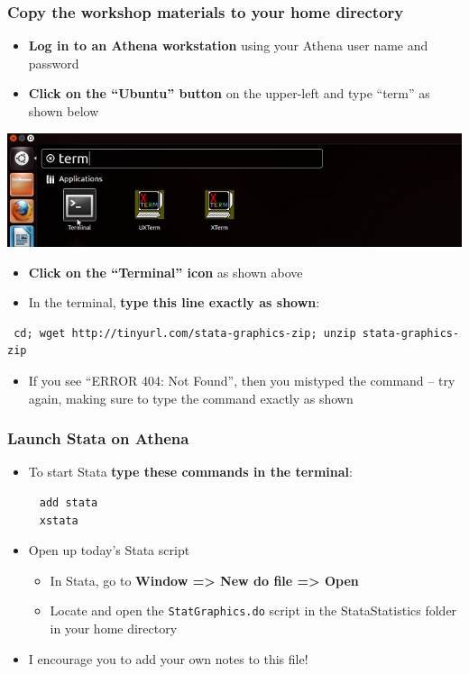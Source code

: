 \documentclass[table]{beamer}
\begin{document}
\begin{frame}[fragile]
\frametitle{Copy the workshop materials to your home directory}
\label{sec-1-2}


\begin{itemize}
\item \textbf{Log in to an Athena workstation} using your Athena user name and password
\item \textbf{Click on the ``Ubuntu'' button} on the upper-left and type ``term'' as shown below
\end{itemize}
\includegraphics[width=.8\textwidth]{./images/OpenTerminal.png}

\begin{itemize}
\item \textbf{Click on the ``Terminal'' icon} as shown above
\item In the terminal, \textbf{type this line exactly as shown}:
\end{itemize}
{\footnotesize
\begin{verbatim}
 cd; wget http://tinyurl.com/stata-graphics-zip; unzip stata-graphics-zip
\end{verbatim}
\normalsize}

\begin{itemize}
\item If you see ``ERROR 404: Not Found'', then you mistyped the command -- try again, making sure to type the command exactly as shown
\end{itemize}
\end{frame}
\begin{frame}[fragile]
\frametitle{Launch Stata on Athena}
\label{sec-1-3}


\begin{itemize}
\item To start Stata \textbf{type these commands in the terminal}:
\end{itemize}
\begin{verbatim}
     add stata
     xstata
\end{verbatim}
\begin{itemize}
\item Open up today's Stata script
\begin{itemize}
\item In Stata, go to \textbf{Window => New do file => Open}
\item Locate and open the \texttt{StatGraphics.do} script in the StataStatistics folder in your home directory
\end{itemize}
\item I encourage you to add your own notes to this file!
\end{itemize}
\end{frame}
\end{document}

